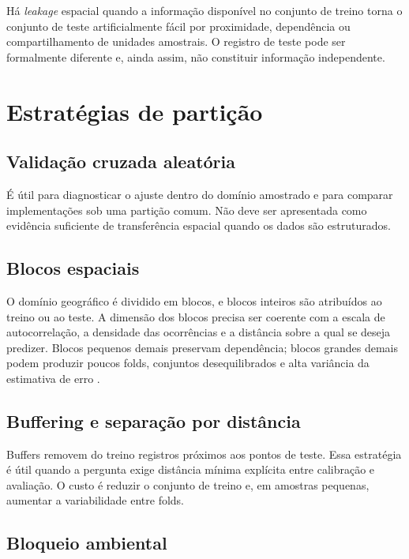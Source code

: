 \begin{conceito}[title={\faBook\quad Leakage espacial}]
	Há \textit{leakage} espacial quando a informação disponível no conjunto de
	treino torna o conjunto de teste artificialmente fácil por proximidade,
	dependência ou compartilhamento de unidades amostrais. O registro de teste
	pode ser formalmente diferente e, ainda assim, não constituir informação
	independente.
\end{conceito}

\section{Estratégias de partição}

\subsection{Validação cruzada aleatória}

É útil para diagnosticar o ajuste dentro do domínio amostrado e para comparar
implementações sob uma partição comum. Não deve ser apresentada como evidência
suficiente de transferência espacial quando os dados são estruturados.

\subsection{Blocos espaciais}

O domínio geográfico é dividido em blocos, e blocos inteiros são atribuídos ao
treino ou ao teste. A dimensão dos blocos precisa ser coerente com a escala de
autocorrelação, a densidade das ocorrências e a distância sobre a qual se deseja
predizer. Blocos pequenos demais preservam dependência; blocos grandes demais
podem produzir poucos folds, conjuntos desequilibrados e alta variância da
estimativa de erro \parencite{roberts2017crossvalidation,valavi2019blockcv}.

\subsection{Buffering e separação por distância}

Buffers removem do treino registros próximos aos pontos de teste. Essa estratégia
é útil quando a pergunta exige distância mínima explícita entre calibração e
avaliação. O custo é reduzir o conjunto de treino e, em amostras pequenas,
aumentar a variabilidade entre folds.

\subsection{Bloqueio ambiental}

